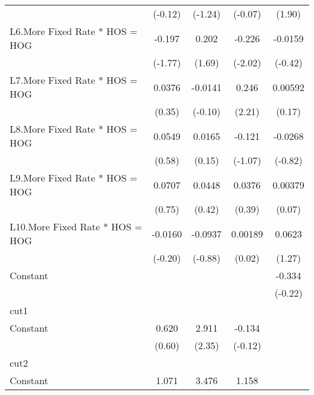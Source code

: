 {\begin{longtable}{l*{4}{c}}
                &  (-0.12)         &  (-1.24)         &  (-0.07)         &   (1.90)         \\
\addlinespace
L6.More Fixed Rate * HOS = HOG&   -0.197         &    0.202         &   -0.226\sym{*}  &  -0.0159         \\
                &  (-1.77)         &   (1.69)         &  (-2.02)         &  (-0.42)         \\
\addlinespace
L7.More Fixed Rate * HOS = HOG&   0.0376         &  -0.0141         &    0.246\sym{*}  &  0.00592         \\
                &   (0.35)         &  (-0.10)         &   (2.21)         &   (0.17)         \\
\addlinespace
L8.More Fixed Rate * HOS = HOG&   0.0549         &   0.0165         &   -0.121         &  -0.0268         \\
                &   (0.58)         &   (0.15)         &  (-1.07)         &  (-0.82)         \\
\addlinespace
L9.More Fixed Rate * HOS = HOG&   0.0707         &   0.0448         &   0.0376         &  0.00379         \\
                &   (0.75)         &   (0.42)         &   (0.39)         &   (0.07)         \\
\addlinespace
L10.More Fixed Rate * HOS = HOG&  -0.0160         &  -0.0937         &  0.00189         &   0.0623         \\
                &  (-0.20)         &  (-0.88)         &   (0.02)         &   (1.27)         \\
\addlinespace
Constant        &                  &                  &                  &   -0.334         \\
                &                  &                  &                  &  (-0.22)         \\
\midrule
cut1            &                  &                  &                  &                  \\
Constant        &    0.620         &    2.911\sym{*}  &   -0.134         &                  \\
                &   (0.60)         &   (2.35)         &  (-0.12)         &                  \\
\midrule
cut2            &                  &                  &                  &                  \\
Constant        &    1.071         &    3.476\sym{**} &    1.158         &                  \\

\end{longtable}}
